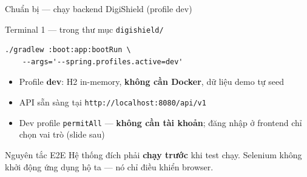 \documentclass[aspectratio=169,12pt]{beamer}
\begin{document}
\begin{frame}[fragile]{Chuẩn bị --- chạy backend DigiShield (profile dev)}
  \begin{exampleblock}{Terminal 1 --- trong thư mục \texttt{digishield/}}
\begin{lstlisting}[language={}]
./gradlew :boot:app:bootRun \
    --args='--spring.profiles.active=dev'
\end{lstlisting}
  \end{exampleblock}

  \begin{itemize}
    \item Profile \textbf{dev}: H2 in-memory, \textbf{không cần Docker},
          dữ liệu demo tự seed
    \item API sẵn sàng tại \texttt{http://localhost:8080/api/v1}
    \item Dev profile \texttt{permitAll} --- \textbf{không cần tài khoản};
          đăng nhập ở frontend chỉ chọn vai trò (slide sau)
  \end{itemize}

  \begin{block}{Nguyên tắc E2E}
    Hệ thống đích phải \textbf{chạy trước} khi test chạy.
    Selenium không khởi động ứng dụng hộ ta --- nó chỉ điều khiển browser.
  \end{block}
\end{frame}
\end{document}
